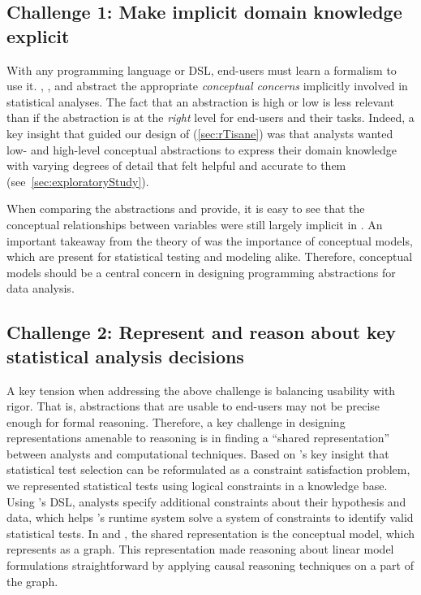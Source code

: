 \subsection{Challenge 1: Make implicit domain knowledge explicit} 
With any programming language or DSL, end-users must learn a formalism to use
it. \tea, \tisane, and \rTisane abstract the appropriate \textit{conceptual
concerns} implicitly involved in statistical analyses. The fact that an
abstraction is high or low is less relevant than if the abstraction is at the
\textit{right} level for end-users and their tasks. Indeed, a key insight that
guided our design of \rTisane (\autoref{sec:rTisane}) was that analysts wanted
low- and high-level conceptual abstractions to express their domain knowledge
with varying degrees of detail that felt helpful and accurate to them
(see~\autoref{sec:exploratoryStudy}). 

When comparing the abstractions \tea and \tisane provide, it is easy to see that
the conceptual relationships between variables were still largely implicit in
\tea. An important takeaway from the theory of \hypoForm was the importance of
conceptual models, which are present for statistical testing and modeling alike.
Therefore, conceptual models should be a central concern in designing
programming abstractions for data analysis. 

\subsection{Challenge 2: Represent and reason about key statistical analysis decisions}
A key tension when addressing the above challenge is balancing usability with
rigor. That is, abstractions that are usable to end-users may not be precise
enough for formal reasoning. Therefore, a key challenge in designing
representations amenable to reasoning is in finding a ``shared
representation''~\cite{heer2019agency} between analysts and computational
techniques. Based on \tea's key insight that statistical test selection can be
reformulated as a constraint satisfaction problem, we represented statistical
tests using logical constraints in a knowledge base. Using \tea's DSL, analysts
specify additional constraints about their hypothesis and data, which helps
\tea's runtime system solve a system of constraints to identify valid
statistical tests. In \tisane and \rTisane, the shared representation is the
conceptual model, which \tisane represents as a graph. This representation made
reasoning about linear model formulations straightforward by applying causal
reasoning techniques on a part of the graph. 

